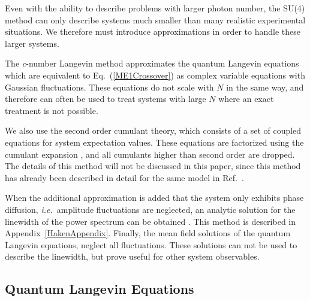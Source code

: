 \documentclass[aps,
twocolumn,
superscriptaddress,groupedaddress]{revtex4}
\begin{document}
Even with the ability to describe problems with larger photon number, the SU(4) method can only describe systems much smaller than many realistic experimental situations. We therefore must introduce approximations in order to handle these larger systems.

The {\it c}-number Langevin method \cite{Scully97, PhysRevA.47.1431} approximates the quantum
Langevin equations which are equivalent to Eq.~(\ref{ME1Crossover}) as complex variable equations with Gaussian fluctuations.
These equations do not scale with $N$ in the same way, and therefore can often be used to treat systems with large $N$ where an exact treatment is not possible. 

We also use the second order cumulant theory, which consists of a set of coupled equations for system expectation values. These equations are factorized using the cumulant expansion \cite{JPSJ.17.1100}, and all cumulants higher than second order are dropped. The details of this method will not be discussed in this paper, since this method has already been described in detail for the same model in Ref.~\cite{PhysRevLett.102.163601}.

When the additional approximation is added that the system only exhibits phase diffusion, {\em i.e.}\ amplitude fluctuations are neglected, an analytic solution for the linewidth of the power spectrum can be obtained \cite{HakenLaser, HakenLaserBook}. This method is described in Appendix~\ref{HakenAppendix}.
Finally, the mean field solutions of the quantum Langevin equations, neglect all fluctuations. These solutions 
can not be used to describe the linewidth, but prove useful for other system observables.


\subsection{Quantum Langevin Equations}
\end{document}
